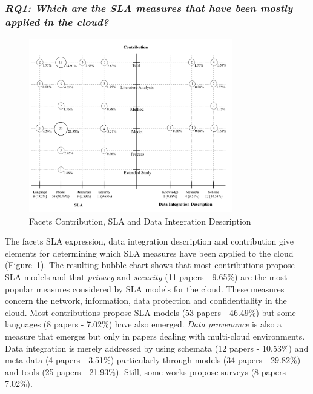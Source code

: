 
 
\subsubsection{\textit{RQ1: Which are the SLA measures that have been mostly applied  in the cloud?}}
\begin{figure}[h!]
\centering
\includegraphics[width=0.79\textwidth]{figs/bubble-charts/Contribution-SLA-DIdescription.pdf}
 
\caption{Facets Contribution, SLA and Data Integration Description}\label{fig:facet1}
\end{figure}

The facets SLA expression, data integration description and contribution give elements for determining which SLA measures have been applied to the cloud (Figure~\ref{fig:facet1}). 
The resulting bubble chart shows that most contributions propose SLA models and that  \textit{privacy}
and \textit{security} (11 papers - 9.65\%) are the most popular measures considered by SLA models for the cloud. These measures concern the network, information, data protection and confidentiality in the cloud. Most contributions propose SLA models (53 papers - 46.49\%)  but some languages (8 papers - 7.02\%) have also emerged. {\em Data provenance} is also a measure that emerges but only in papers dealing with multi-cloud environments. Data integration is merely addressed by using schemata (12 papers - 10.53\%)  and meta-data (4 papers - 3.51\%) particularly through models (34 papers - 29.82\%) and tools (25 papers - 21.93\%). Still, some works propose surveys (8 papers - 7.02\%).
 
